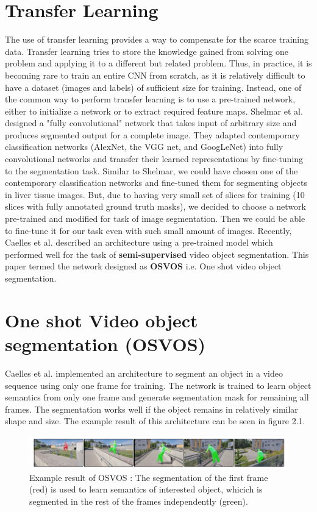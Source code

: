 \section{Transfer Learning}
The use of transfer learning provides a way to compensate for the scarce training data.
Transfer learning tries to store the knowledge gained from solving one problem and applying it to a different but related problem. Thus, in practice, it is becoming rare to train an entire CNN from scratch, as it is relatively difficult to have a dataset (images and labels) of sufficient size for training. Instead, one of the common way to perform transfer learning is to use a pre-trained network, either to initialize a network or to extract required feature maps. Shelmar et al. \cite{long:2014} designed a "fully convolutional" network that takes input of arbitrary size and produces segmented output for a complete image. They adapted contemporary classification networks (AlexNet, the VGG net, and GoogLeNet) into fully convolutional networks and transfer their learned representations by fine-tuning to the segmentation task. Similar to Shelmar, we could have chosen one of the contemporary classification networks and fine-tuned them for segmenting objects in liver tissue images. But, due to having very small set of slices for training (10 slices with fully annotated ground truth masks), we decided to choose a network pre-trained and modified for task of image segmentation. Then we could be able to fine-tune it for our task even with such small amount of images. Recently, Caelles et al. \cite{osvos} described an architecture using a pre-trained model which performed well for the task of \textbf{semi-supervised} video object segmentation. This paper termed the network designed as \textbf{OSVOS} i.e. One shot video object segmentation.



\section{One shot Video object segmentation (OSVOS)}
Caelles et al. \cite{osvos} implemented an architecture to segment an object in a video sequence using only one frame for training. The network is trained to learn object semantics from only one frame and generate segmentation mask for remaining all frames. The segmentation works well if the object remains in relatively similar shape and size. 
The example result of this architecture can be seen in figure 2.1.
\begin{figure}[h!]\label{fig:osvos1}
\centering
 \includegraphics[width=1.0\linewidth]{figures/osvos1.png} 
\caption{ Example result of OSVOS \cite{osvos}: The segmentation of the first frame (red) is used to learn semantics of interested object, whicich is segmented in the rest of the frames independently (green).}
\end{figure}

